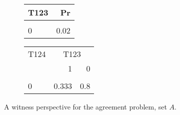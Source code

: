 \documentclass[10pt,]{scrartcl}
\begin{document}
\begin{figure}
\hspace{2cm}\hfill
\begin{subfigure}[!ht]{0.6\textwidth}
\begin{table}[H]
\centering
\begin{tabular}{lr}
\toprule
T123 & Pr\\
\midrule
\cellcolor{gray!6}{1} & \cellcolor{gray!6}{0.98}\\
0 & 0.02\\
\bottomrule
\end{tabular}
\end{table}

\begin{table}[H]
\centering\begingroup\fontsize{9}{11}\selectfont

\begin{tabular}{lrr}
\toprule
\multicolumn{1}{c}{T124} & \multicolumn{2}{c}{T123} \\
  & 1 & 0\\
\midrule
\cellcolor{gray!6}{1} & \cellcolor{gray!6}{0.667} & \cellcolor{gray!6}{0.2}\\
0 & 0.333 & 0.8\\
\bottomrule
\end{tabular}
\endgroup{}
\end{table}
\end{subfigure}
\caption{A witness perspective for the \textsf{agreement} problem, set $A$.}
\end{figure}
\end{document}
